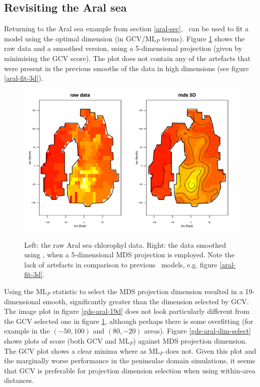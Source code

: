 \subsection{Revisiting the Aral sea}
\label{aral-revisit}
Returning to the Aral sea example from section \ref{aral-sec}, \mdsds\ can be used to fit a model using the optimal dimension (in GCV/$\text{ML}_P$ terms). Figure \ref{mds-aral-5d-duchon} shows the raw data and a smoothed version, using a 5-dimensional projection (given by minimising the GCV score). The plot does not contain any of the artefacts that were present in the previous smooths of the data in high dimensions (see figure \ref{aral-fit-3d}).

\begin{figure}[t]
\centering
\includegraphics[width=\textwidth]{mds/figs/aral-5d-duchon.pdf} \\
\caption{Left: the raw Aral sea chlorophyl data. Right: the data smoothed using \mdsds, when a 5-dimensional MDS projection is employed. Note the lack of artefacts in comparison to previous \mdsap\ models, e.g. figure \ref{aral-fit-3d}.}
\label{mds-aral-5d-duchon}
\end{figure}

Using the $\text{ML}_P$ statistic to select the MDS projection dimension resulted in a 19-dimensional smooth, significantly greater than the dimension selected by GCV. The image plot in figure \ref{gds-aral-19d} does not look particularly different from the GCV selected one in figure \ref{mds-aral-5d-duchon}, although perhaps there is some overfitting (for example in the $(-50,100)$ and $(80,-20)$ areas). Figure \ref{gds-aral-dim-select} shows plots of score (both GCV and $\text{ML}_P$) against MDS projection dimension. The GCV plot shows a clear minima where as $\text{ML}_P$ does not. Given this plot and the marginally worse performance in the peninsulae domain simulations, it seems that GCV is preferable for projection dimension selection when using within-area distances.

